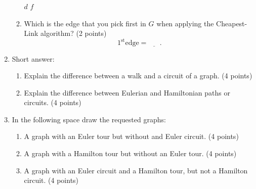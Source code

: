 \documentclass[12pt]{exam}
\begin{document}
\begin{enumerate}
\begin{enumerate}
\begin{checkboxes}
    \choice $d$
    \choice $f$
\end{checkboxes}
\vfill
\item \label{lastQnSec2} Which is the edge that you pick first in $G$ when applying the Cheapest-Link algorithm? (2 points)
$$1^{\text{st}}\text{edge}=\underline{\phantom{ans}}.$$
\vfill
\end{enumerate}
\newpage
\item Short answer:
\begin{enumerate}
    \item Explain the difference between a walk and a circuit of a graph. (4 points)
    \vspace{3cm}
    \item Explain the difference between Eulerian and Hamiltonian paths or circuits. (4 points)
    \vspace{3cm}
\end{enumerate}


\item In the following space draw the requested graphs:
\begin{enumerate}
    \item A graph with an Euler tour but without and Euler circuit. (4 points)
    \vspace{3.5cm}
    \item A graph with a Hamilton tour but without an Euler tour. (4 points)
    \vspace{3.5cm}
    \item A graph with an Euler circuit and a Hamilton tour, but not a Hamilton circuit. (4 points)
    \vfill
\end{enumerate}


\end{enumerate}
\end{document}
